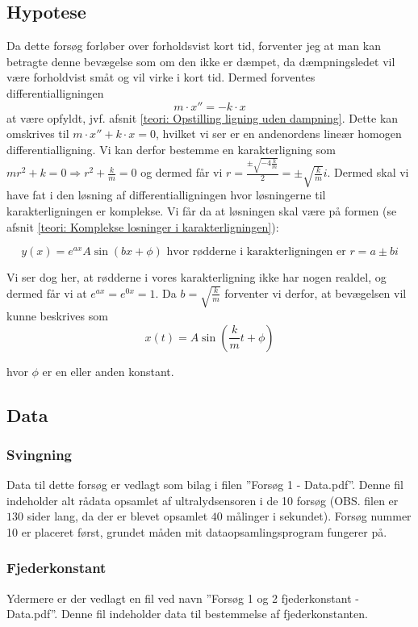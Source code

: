 \subsection{Hypotese}\label{exp1: Hypotese}
Da dette forsøg forløber over forholdsvist kort tid, forventer jeg at man kan betragte denne bevægelse som om den ikke er dæmpet, da dæmpningsledet vil være forholdvist småt og vil virke i kort tid. 
Dermed forventes differentialligningen 
$$m\cdot x'' = -k \cdot x$$
at være opfyldt, jvf. afsnit \ref{teori: Opstilling ligning uden dampning}.
Dette kan omskrives til $m\cdot x'' + k\cdot x=0$, hvilket vi ser er en andenordens lineær homogen differentialligning. 
Vi kan derfor bestemme en karakterligning som $mr^2 + k = 0 \Rightarrow r^2 + \frac{k}{m} = 0$ og dermed får vi $r = \frac{\pm \sqrt{-4\frac{k}{m}}}{2}=\pm\sqrt{\frac{k}{m}}i$.
Dermed skal vi have fat i den løsning af differentialligningen hvor løsningerne til karakterligningen er komplekse. 
Vi får da at løsningen skal være på formen (se afsnit \ref{teori: Komplekse losninger i karakterligningen}):

$$y(x) = e^{ax}A\sin(bx+\phi) \text{ hvor rødderne i karakterligningen er } r = a \pm bi$$

Vi ser dog her, at rødderne i vores karakterligning ikke har nogen realdel, og dermed får vi at $e^{ax}=e^{0x}=1$.
Da $b=\sqrt{\frac{k}{m}}$ forventer vi derfor, at bevægelsen vil kunne beskrives som 
\begin{equation}
x(t)=A\sin (\frac{k}{m}t+\phi)
\label{eq: exp1 hypotese}
\end{equation}

hvor $\phi$ er en eller anden konstant. 


\subsection{Data}\label{exp1: Data}
\subsubsection{Svingning}
Data til dette forsøg er vedlagt som bilag i filen ''Forsøg 1 - Data.pdf''.
Denne fil indeholder alt rådata opsamlet af ultralydsensoren i de 10 forsøg (OBS. filen er $130$ sider lang, da der er blevet opsamlet $40$ målinger i sekundet). 
Forsøg nummer 10 er placeret først, grundet måden mit dataopsamlingsprogram fungerer på.

\subsubsection{Fjederkonstant}\label{exp1: Fjederkonstant}
Ydermere er der vedlagt en fil ved navn ''Forsøg 1 og 2 fjederkonstant - Data.pdf''.
Denne fil indeholder data til bestemmelse af fjederkonstanten. 

